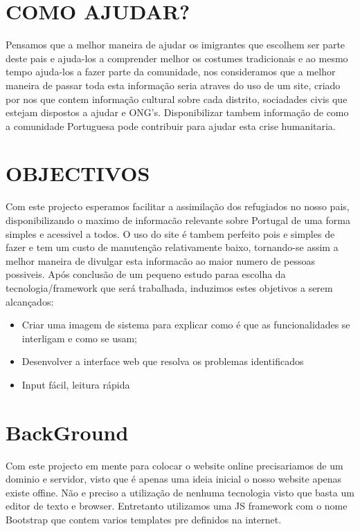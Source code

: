 \documentclass{article}
\begin{document}
\section{COMO AJUDAR?}
Pensamos que a melhor maneira de ajudar os imigrantes
que escolhem ser parte deste pais e ajuda-los a comprender
melhor os costumes tradicionais e ao mesmo tempo ajuda-los
a fazer parte da comunidade, nos consideramos que a melhor
maneira de passar toda esta informação seria atraves do uso
de um site, criado por nos que contem informação cultural
sobre cada distrito, sociadades civis que estejam dispostos
a ajudar e ONG's. Disponibilizar tambem informação de
como a comunidade Portuguesa pode contribuir para ajudar
esta crise humanitaria.

\section{OBJECTIVOS}
Com este projecto esperamos facilitar a assimilação dos
refugiados no nosso pais, disponibilizando o maximo de informacão relevante sobre Portugal de uma forma simples e
acessivel a todos. O uso do site é tambem perfeito pois e simples
de fazer e tem um custo de manutenção relativamente
baixo, tornando-se assim a melhor maneira de divulgar esta
informacão ao maior numero de pessoas possiveis.
Após conclusão de um pequeno estudo paraa escolha da tecnologia/framework que será trabalhada, induzimos estes objetivos a serem alcançados:
\begin{itemize}
\item Criar uma imagem de sistema para explicar como é que as funcionalidades se interligam e como se usam;
\item Desenvolver a interface web que resolva os problemas identificados
\item Input fácil, leitura rápida
\end{itemize}

\section{BackGround}
Com este projecto em mente para colocar o website online
precisariamos de um dominio e servidor, visto que é apenas
uma ideia inicial o nosso website apenas existe offine.
Não e preciso a utilização de nenhuma tecnologia visto que
basta um editor de texto e browser. Entretanto utilizamos uma JS framework com o nome Bootstrap que contem varios templates 
pre definidos na internet.
\end{document}
